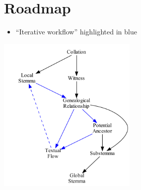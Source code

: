\documentclass[10pt]{beamer}
\begin{document}
	\section*{Roadmap}
	\begin{frame}
		\begin{itemize}
			\item ``Iterative workflow'' highlighted in blue
		\end{itemize}
		\begin{center}
			\includegraphics[width=0.5\textwidth]{../img/roadmap.pdf}
		\end{center}
	\end{frame}
\end{document}
